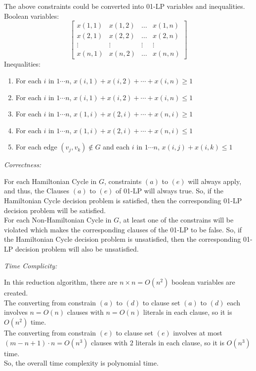 \documentclass[12pt,letterpaper]{article}
\def\pp{\par\noindent}
\newcommand{\correctness}{\medskip\pp\textit{Correctness:}\par}
\newcommand{\timecomplexity}{\medskip\pp\textit{Time Complicity:}\par}
\begin{document}
\begin{enumerate}
\begin{enumerate}[itemsep=0mm]
		\end{enumerate}
		The above constraints could be converted into 01-LP variables and inequalities.\\
		Boolean variables:
		\[
			\begin{bmatrix}
				x(1,1) & x(1,2) & \hdots & x(1,n)\\
				x(2,1) & x(2,2) & \hdots & x(2,n)\\
				\vdots & \vdots & \vdots & \vdots\\
				x(n,1) & x(n,2) & \hdots & x(n,n)
			\end{bmatrix}
		\]
		Inequalities:
		\begin{enumerate}[itemsep=0mm]
			\item For each $i$ in $1\cdots n$, $x(i,1)+x(i,2)+\cdots+x(i,n)\geq1$
			\item For each $i$ in $1\cdots n$, $x(i,1)+x(i,2)+\cdots+x(i,n)\leq1$
			\item For each $i$ in $1\cdots n$, $x(1,i)+x(2,i)+\cdots+x(n,i)\geq1$
			\item For each $i$ in $1\cdots n$, $x(1,i)+x(2,i)+\cdots+x(n,i)\leq1$
			\item For each edge $(v_j,v_k)\notin G$ and each $i$ in $1\cdots n$, $x(i,j)+x(i,k)\leq 1$
		\end{enumerate}
		\correctness
		For each Hamiltonian Cycle in $G$, constraints $(a)$ to $(e)$ will always apply, and thus, the Clauses $(a)$ to $(e)$ of 01-LP will always true. So, if the Hamiltonian Cycle decision problem is satisfied, then the corresponding 01-LP decision problem will be satisfied.\\
		For each Non-Hamiltonian Cycle in $G$, at least one of the constrains will be violated which makes the corresponding clauses of the 01-LP to be false. So, if the Hamiltonian Cycle decision problem is unsatisfied, then the corresponding 01-LP decision problem will also be unsatisfied.
		\timecomplexity
		In this reduction algorithm, there are $n\times n=O(n^2)$ boolean variables are created.\\
		The converting from constrain $(a)$ to $(d)$ to clause set $(a)$ to $(d)$ each involves $n=O(n)$ clauses with $n=O(n)$ literals in each clause, so it is $O(n^2)$ time.\\
		The converting from constrain $(e)$ to clause set $(e)$ involves at most $(m-n+1)\cdot n=O(n^3)$ clauses with $2$ literals in each clause, so it is $O(n^3)$ time.\\
		So, the overall time complexity is polynomial time.
		
\end{enumerate}
\end{document}
